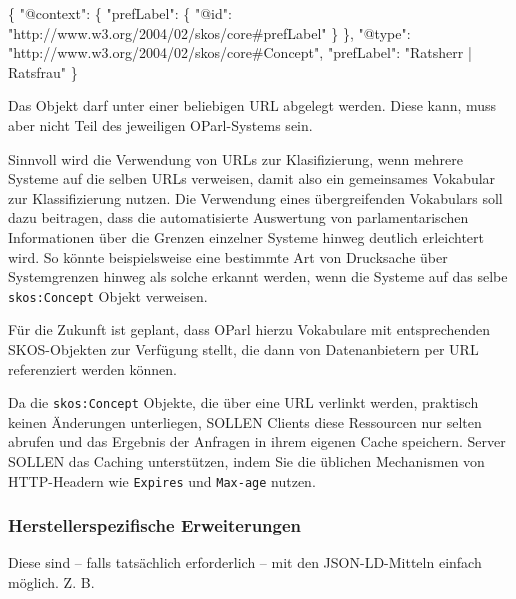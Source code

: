 \documentclass[,a4paper]{article}
\newenvironment{Shaded}{}{}
\newcommand{\DataTypeTok}[1]{\textcolor[rgb]{0.56,0.13,0.00}{{#1}}}
\newcommand{\StringTok}[1]{\textcolor[rgb]{0.25,0.44,0.63}{{#1}}}
\newcommand{\FunctionTok}[1]{\textcolor[rgb]{0.02,0.16,0.49}{{#1}}}
\begin{document}
\begin{Shaded}
\begin{Highlighting}[]
\FunctionTok{\{}
    \DataTypeTok{"@context"}\FunctionTok{:} \FunctionTok{\{}
        \DataTypeTok{"prefLabel"}\FunctionTok{:} \FunctionTok{\{}
            \DataTypeTok{"@id"}\FunctionTok{:} \StringTok{"http://www.w3.org/2004/02/skos/core#prefLabel"}
        \FunctionTok{\}}
    \FunctionTok{\},}
    \DataTypeTok{"@type"}\FunctionTok{:} \StringTok{"http://www.w3.org/2004/02/skos/core#Concept"}\FunctionTok{,}
    \DataTypeTok{"prefLabel"}\FunctionTok{:} \StringTok{"Ratsherr | Ratsfrau"}
\FunctionTok{\}}
\end{Highlighting}
\end{Shaded}

Das Objekt darf unter einer beliebigen URL abgelegt werden. Diese kann,
muss aber nicht Teil des jeweiligen OParl-Systems sein.

Sinnvoll wird die Verwendung von URLs zur Klasifizierung, wenn mehrere
Systeme auf die selben URLs verweisen, damit also ein gemeinsames
Vokabular zur Klassifizierung nutzen. Die Verwendung eines
übergreifenden Vokabulars soll dazu beitragen, dass die automatisierte
Auswertung von parlamentarischen Informationen über die Grenzen
einzelner Systeme hinweg deutlich erleichtert wird. So könnte
beispielsweise eine bestimmte Art von Drucksache über Systemgrenzen
hinweg als solche erkannt werden, wenn die Systeme auf das selbe
\texttt{skos:Concept} Objekt verweisen.

Für die Zukunft ist geplant, dass OParl hierzu Vokabulare mit
entsprechenden SKOS-Objekten zur Verfügung stellt, die dann von
Datenanbietern per URL referenziert werden können.

Da die \texttt{skos:Concept} Objekte, die über eine URL verlinkt werden,
praktisch keinen Änderungen unterliegen, SOLLEN Clients diese Ressourcen
nur selten abrufen und das Ergebnis der Anfragen in ihrem eigenen Cache
speichern. Server SOLLEN das Caching unterstützen, indem Sie die
üblichen Mechanismen von HTTP-Headern wie \texttt{Expires} und
\texttt{Max-age} nutzen.

\subsubsection{Herstellerspezifische
Erweiterungen}\label{herstellerspezifische-erweiterungen}

Diese sind -- falls tatsächlich erforderlich -- mit den JSON-LD-Mitteln
einfach möglich. Z. B.
\end{document}
